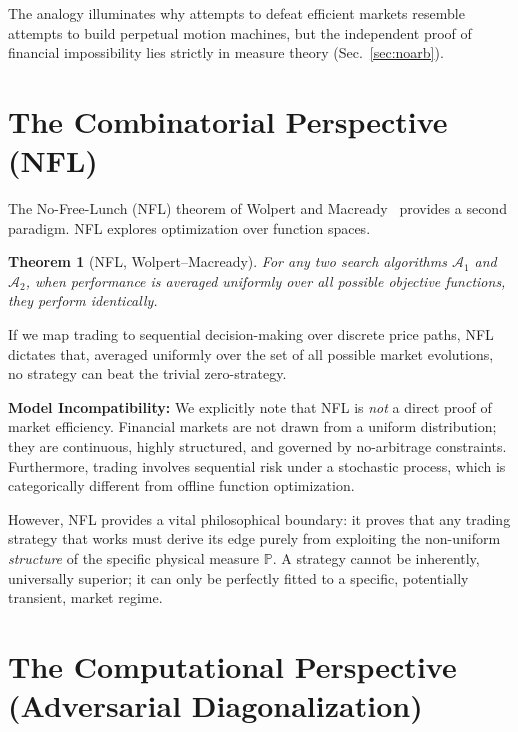 \documentclass[aps,pra,reprint,superscriptaddress,amsmath,amssymb]{revtex4-2}
\theoremstyle{plain}
\newtheorem{theorem}{Theorem}
\theoremstyle{definition}
\theoremstyle{remark}
\begin{document}
The analogy illuminates why attempts to defeat efficient markets resemble attempts to build perpetual motion machines, but the independent proof of financial impossibility lies strictly in measure theory (Sec.~\ref{sec:noarb}).

\section{The Combinatorial Perspective (NFL)}
\label{sec:nfl}

The No-Free-Lunch (NFL) theorem of Wolpert and Macready~\cite{Wolpert:1997:NFL:2221336.2221408} provides a second paradigm. NFL explores optimization over function spaces.

\begin{theorem}[NFL, Wolpert--Macready]
  For any two search algorithms $\mathcal{A}_1$ and $\mathcal{A}_2$, when performance is averaged uniformly over all possible objective functions, they perform identically.
\end{theorem}

If we map trading to sequential decision-making over discrete price paths, NFL dictates that, averaged uniformly over the set of all possible market evolutions, no strategy can beat the trivial zero-strategy.

\textbf{Model Incompatibility:} We explicitly note that NFL is \emph{not} a direct proof of market efficiency. Financial markets are not drawn from a uniform distribution; they are continuous, highly structured, and governed by no-arbitrage constraints. Furthermore, trading involves sequential risk under a stochastic process, which is categorically different from offline function optimization.

However, NFL provides a vital philosophical boundary: it proves that any trading strategy that works must derive its edge purely from exploiting the non-uniform \emph{structure} of the specific physical measure $\mathbb{P}$. A strategy cannot be inherently, universally superior; it can only be perfectly fitted to a specific, potentially transient, market regime.

\section{The Computational Perspective (Adversarial Diagonalization)}
\label{sec:computability}
\end{document}
